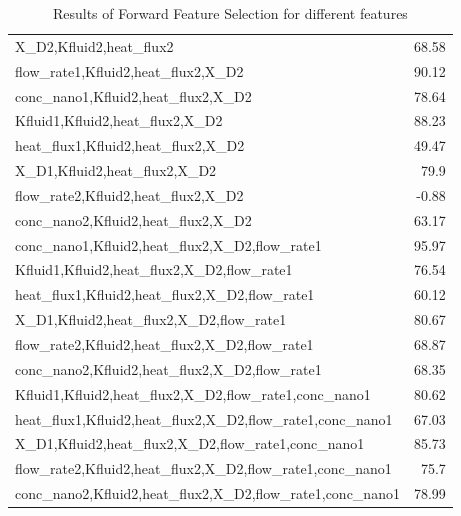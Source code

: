 \begin{table*}
\begin{tabular}{lr}
 X\_D2,Kfluid2,heat\_flux2                                     & 68.58 \\
 flow\_rate1,Kfluid2,heat\_flux2,X\_D2                         & 90.12 \\
 conc\_nano1,Kfluid2,heat\_flux2,X\_D2                         & 78.64 \\
 Kfluid1,Kfluid2,heat\_flux2,X\_D2                             & 88.23 \\
 heat\_flux1,Kfluid2,heat\_flux2,X\_D2                         & 49.47 \\
 X\_D1,Kfluid2,heat\_flux2,X\_D2                               & 79.9  \\
 flow\_rate2,Kfluid2,heat\_flux2,X\_D2                         & -0.88 \\
 conc\_nano2,Kfluid2,heat\_flux2,X\_D2                         & 63.17 \\
 conc\_nano1,Kfluid2,heat\_flux2,X\_D2,flow\_rate1             & 95.97 \\
 Kfluid1,Kfluid2,heat\_flux2,X\_D2,flow\_rate1                 & 76.54 \\
 heat\_flux1,Kfluid2,heat\_flux2,X\_D2,flow\_rate1             & 60.12 \\
 X\_D1,Kfluid2,heat\_flux2,X\_D2,flow\_rate1                   & 80.67 \\
 flow\_rate2,Kfluid2,heat\_flux2,X\_D2,flow\_rate1             & 68.87 \\
 conc\_nano2,Kfluid2,heat\_flux2,X\_D2,flow\_rate1             & 68.35 \\
 Kfluid1,Kfluid2,heat\_flux2,X\_D2,flow\_rate1,conc\_nano1     & 80.62 \\
 heat\_flux1,Kfluid2,heat\_flux2,X\_D2,flow\_rate1,conc\_nano1 & 67.03 \\
 X\_D1,Kfluid2,heat\_flux2,X\_D2,flow\_rate1,conc\_nano1       & 85.73 \\
 flow\_rate2,Kfluid2,heat\_flux2,X\_D2,flow\_rate1,conc\_nano1 & 75.7  \\
 conc\_nano2,Kfluid2,heat\_flux2,X\_D2,flow\_rate1,conc\_nano1 & 78.99 \\
\hline
\end{tabular}
        \caption{Results of Forward Feature Selection for different features}
        \label{forward}
    \end{table*}
    
